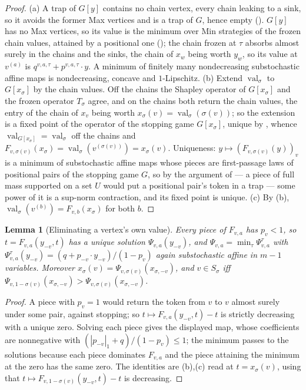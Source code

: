 \documentclass[11pt]{article}
\theoremstyle{plain}
\newtheorem{lemma}[theorem]{Lemma}
\theoremstyle{definition}
\DeclareMathOperator{\val}{val}
\begin{document}
\begin{proof}
(a) A trap of $G[y]$ contains no chain vertex, every chain leaking to
a sink, so it avoids the former Max vertices and is a trap of $G$, hence
empty (). $G[y]$ has no Max vertices, so its value is
the minimum over Min strategies of the frozen chain values, attained by a
positional one (); the chain frozen at
$\tau$ absorbs almost surely in the chains and the sinks, the chain of
$x_w$ being worth $y_w$, so its value at $v^{(a)}$ is
$q^{v,a,\tau}+p^{v,a,\tau}\cdot y$. A minimum of finitely many
nondecreasing substochastic affine maps is nondecreasing, concave and
$1$-Lipschitz. (b) Extend $\val_\sigma$ to $G[x_\sigma]$ by the chain
values. Off the chains the Shapley operator of $G[x_\sigma]$ and the
frozen operator $T_\sigma$ agree, and on the chains both return the
chain values, the entry of the chain of $x_v$ being worth
$x_\sigma(v)=\val_\sigma(\sigma(v))$; so the extension is a fixed point of
the operator of the stopping game $G[x_\sigma]$, unique by
, whence $\val_{G[x_\sigma]}=\val_\sigma$ off the
chains and $F_{v,\sigma(v)}(x_\sigma)=\val_\sigma(v^{(\sigma(v))})=x_\sigma(v)$.
Uniqueness: $y\mapsto(F_{v,\sigma(v)}(y))_v$ is a minimum of substochastic
affine maps whose pieces are first-passage laws of positional pairs of
the stopping game $G$, so by the argument of 
--- a piece of full mass supported on a set $U$ would put a positional
pair's token in a trap --- some power of it is a sup-norm contraction,
and its fixed point is unique. (c) By (b),
$\val_\sigma(v^{(b)})=F_{v,b}(x_\sigma)$ for both $b$.
\end{proof}

\begin{lemma}[Eliminating a vertex's own value]\label{lem:readout-reduce}
Every piece of $F_{v,a}$ has $p_v<1$, so $t=F_{v,a}(y_{-v},t)$ has a
unique solution $\Psi_{v,a}(y_{-v})$, and
$\Psi_{v,a}=\min_\tau\Psi^{\tau}_{v,a}$ with
$\Psi^{\tau}_{v,a}(y_{-v})=(q+p_{-v}\cdot y_{-v})/(1-p_v)$ again
substochastic affine in $m-1$ variables. Moreover
$x_\sigma(v)=\Psi_{v,\sigma(v)}(x_{\sigma,-v})$, and $v\in S_\sigma$ iff
$\Psi_{v,1-\sigma(v)}(x_{\sigma,-v})>\Psi_{v,\sigma(v)}(x_{\sigma,-v})$.
\end{lemma}

\begin{proof}
A piece with $p_v=1$ would return the token from $v$ to $v$ almost surely
under some pair, against stopping; so $t\mapsto F_{v,a}(y_{-v},t)-t$ is
strictly decreasing with a unique zero. Solving each piece gives the
displayed map, whose coefficients are nonnegative with
$(|p_{-v}|_1+q)/(1-p_v)\le1$; the minimum passes to the solutions because
each piece dominates $F_{v,a}$ and the piece attaining the minimum at the
zero has the same zero. The identities are (b),(c) read
at $t=x_\sigma(v)$, using that $t\mapsto F_{v,1-\sigma(v)}(y_{-v},t)-t$
is decreasing.
\end{proof}
\end{document}
